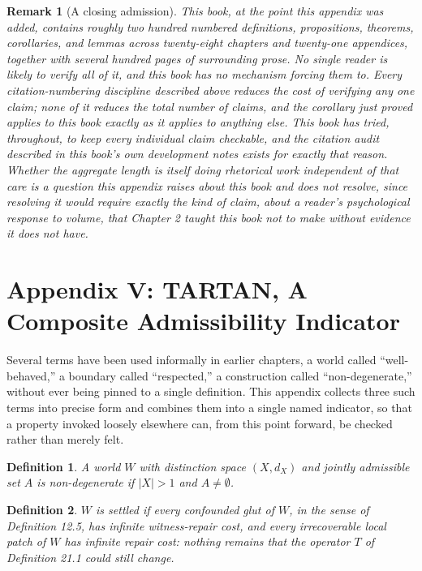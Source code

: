 \documentclass[11pt]{book}
\newtheorem*{appendixdefinition}{Definition}
\newtheorem*{appendixremark}{Remark}
\begin{document}
\begin{appendixremark}[A closing admission]
This book, at the point this appendix was added, contains roughly two hundred numbered definitions, propositions, theorems, corollaries, and lemmas across twenty-eight chapters and twenty-one appendices, together with several hundred pages of surrounding prose. No single reader is likely to verify all of it, and this book has no mechanism forcing them to. Every citation-numbering discipline described above reduces the cost of verifying any one claim; none of it reduces the total number of claims, and the corollary just proved applies to this book exactly as it applies to anything else. This book has tried, throughout, to keep every individual claim checkable, and the citation audit described in this book's own development notes exists for exactly that reason. Whether the aggregate length is itself doing rhetorical work independent of that care is a question this appendix raises about this book and does not resolve, since resolving it would require exactly the kind of claim, about a reader's psychological response to volume, that Chapter 2 taught this book not to make without evidence it does not have.
\end{appendixremark}



\chapter*{Appendix V: TARTAN, A Composite Admissibility Indicator}

Several terms have been used informally in earlier chapters, a world called ``well-behaved,'' a boundary called ``respected,'' a construction called ``non-degenerate,'' without ever being pinned to a single definition. This appendix collects three such terms into precise form and combines them into a single named indicator, so that a property invoked loosely elsewhere can, from this point forward, be checked rather than merely felt.

\begin{appendixdefinition}
A world $W$ with distinction space $(X, d_X)$ and jointly admissible set $A$ is \emph{non-degenerate} if $|X| > 1$ and $A \neq \emptyset$.
\end{appendixdefinition}

\begin{appendixdefinition}
$W$ is \emph{settled} if every confounded glut of $W$, in the sense of Definition 12.5, has infinite witness-repair cost, and every irrecoverable local patch of $W$ has infinite repair cost: nothing remains that the operator $T$ of Definition 21.1 could still change.
\end{appendixdefinition}
\end{document}
